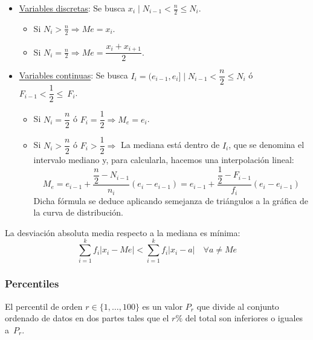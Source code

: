 \begin{itemize}
    \item \underline{Variables discretas}:
    Se busca $x_i \mid N_{i-1} < \frac{n}{2} \leq N_i$.
    \begin{itemize}
        \item Si $N_i > \frac{n}{2} \Rightarrow Me = x_i$.
        \item Si $N_i = \frac{n}{2} \Rightarrow Me = \dfrac{x_i + x_{i+1}}{2}$.
    \end{itemize}

    \item \underline{Variables continuas}:
    Se busca $I_i = (e_{i-1}, e_i] \mid N_{i-1} < \dfrac{n}{2} \leq N_i$ ó $F_{i-1} < \dfrac{1}{2} \leq~F_i$.
    \begin{itemize}
        \item Si $N_i = \dfrac{n}{2} $ ó $ F_i = \dfrac{1}{2} \Rightarrow M_e = e_i$.
        \item Si $N_i > \dfrac{n}{2}$ ó $F_i > \dfrac{1}{2} \Rightarrow$ La mediana está dentro de $I_i$, que se denomina el intervalo
              mediano y, para calcularla, hacemos una interpolación lineal:
              $$M_e = e_{i-1} + \dfrac{\dfrac{n}{2}-N_{i-1}}{n_i}(e_i - e_{i-1}) = e_{i-1} + \dfrac{\dfrac{1}{2} - F_{i-1}}{f_i}(e_i - e_{i-1})$$
              Dicha fórmula se deduce aplicando semejanza de triángulos a la gráfica de la curva de distribución.
    \end{itemize}
\end{itemize}

\begin{prop}
    La desviación absoluta media respecto a la mediana es mínima:
    $$\sum_{i=1}^k f_i |x_i - Me| < \sum_{i=1}^k f_i |x_i - a| \quad \forall a \neq Me$$
\end{prop}

\subsubsection{Percentiles}
El percentil de orden $r \in \{1, \ldots, 100\}$ es un valor $P_r$ que divide al conjunto ordenado de datos en dos partes tales que el $r\%$ del total son inferiores o iguales a~$P_r$.

